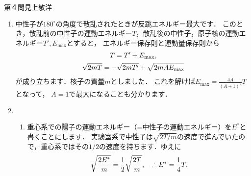 \newcommand{\odif}[2]{\frac{d{#1}}{d{#2}}}

\begin{answer}{第４問}{見上敬洋}
\begin{enumerate}
\item
  中性子が$180^\circ$の角度で散乱されたときが反跳エネルギー最大です．
  このとき，散乱前の中性子の運動エネルギー$T$，散乱後の中性子，原子核の運動エネルギー$T', E_\mathrm{max}$とすると，
  エネルギー保存則と運動量保存則から
  \begin{gather}
    T = T' + E_\mathrm{max} , \notag\\
    \sqrt{2mT} = -\sqrt{2mT'} + \sqrt{2mAE_\mathrm{max}} \notag
  \end{gather}
  が成り立ちます．核子の質量$m$としました．
  これを解けば$\displaystyle E_\mathrm{max} = \frac{4A}{(A+1)^2} T$となって，
  $A=1$で最大になることも分かります．

  \begin{figure}[h]
    \begin{center}
      
    \end{center}
  \end{figure}

\item
  \begin{enumerate}
  \item
    重心系での陽子の運動エネルギー（=中性子の運動エネルギー）を$E^*$と書くことにします．
    実験室系で中性子は$\sqrt{2T/m}$の速度で進んでいたので，重心系ではその$1/2$の速度を持ちます．ゆえに
    \begin{equation}
      \sqrt{\dfrac{2E^*}{m}} = \frac 12 \sqrt{\dfrac{2T}{m}} , \quad \therefore E^* = \frac 14 T. \notag
    \end{equation}


\end{enumerate}
\end{enumerate}
\end{answer}

